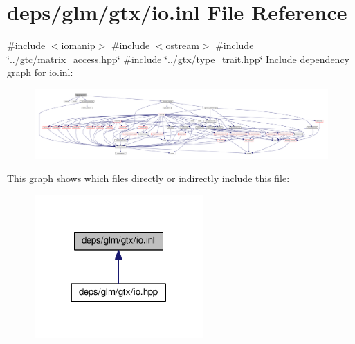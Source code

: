 \hypertarget{io_8inl}{}\section{deps/glm/gtx/io.inl File Reference}
\label{io_8inl}
{\ttfamily \#include $<$iomanip$>$}\newline
{\ttfamily \#include $<$ostream$>$}\newline
{\ttfamily \#include \char`\"{}../gtc/matrix\+\_\+access.\+hpp\char`\"{}}\newline
{\ttfamily \#include \char`\"{}../gtx/type\+\_\+trait.\+hpp\char`\"{}}\newline
Include dependency graph for io.\+inl\+:
\nopagebreak
\begin{figure}[H]
\begin{center}
\leavevmode
\includegraphics[width=350pt]{db/dd1/io_8inl__incl}
\end{center}
\end{figure}
This graph shows which files directly or indirectly include this file\+:
\nopagebreak
\begin{figure}[H]
\begin{center}
\leavevmode
\includegraphics[width=182pt]{d2/d0d/io_8inl__dep__incl}
\end{center}
\end{figure}
